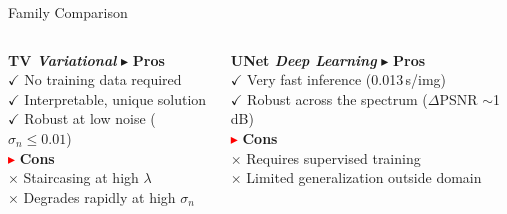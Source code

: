 \documentclass[english,10pt]{beamer}
\begin{document}
\begin{frame}{Family Comparison}
  \begin{columns}[t]
      {%
      \begin{block}{\small\bfseries TV  \hfill \scriptsize\itshape Variational}
        \scriptsize
        \textcolor{green!50!black}{$\blacktriangleright$} \textbf{Pros}\\[0.05cm]
        \hspace{0.3cm}$\checkmark$ No training data required\\
        \hspace{0.3cm}$\checkmark$ Interpretable, unique solution\\
        \hspace{0.3cm}$\checkmark$ Robust at low noise ($\sigma_n \leq 0.01$)\\[0.08cm]
        \textcolor{red}{$\blacktriangleright$} \textbf{Cons}\\[0.05cm]
        \hspace{0.3cm}$\times$ Staircasing at high $\lambda$\\
        \hspace{0.3cm}$\times$ Degrades rapidly at high $\sigma_n$
      \end{block}}

      {%
      \begin{block}{\small\bfseries UNet  \hfill \scriptsize\itshape Deep Learning}
        \scriptsize
        \textcolor{green!50!black}{$\blacktriangleright$} \textbf{Pros}\\[0.05cm]
        \hspace{0.3cm}$\checkmark$ Very fast inference (0.013\,s/img)\\
        \hspace{0.3cm}$\checkmark$ Robust across the spectrum ($\Delta$PSNR $\sim$1\,dB)\\[0.08cm]
        \textcolor{red}{$\blacktriangleright$} \textbf{Cons}\\[0.05cm]
        \hspace{0.3cm}$\times$ Requires supervised training\\
        \hspace{0.3cm}$\times$ Limited generalization outside domain
      \end{block}}
  \end{columns}


\end{frame}
\end{document}
